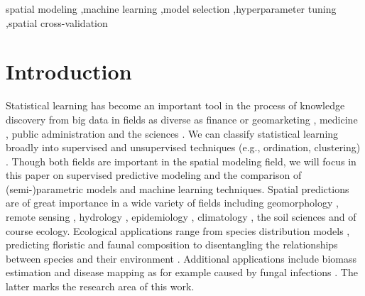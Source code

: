 \documentclass[review]{elsarticle}
\begin{document}
\begin{frontmatter}
	\begin{keyword}
		spatial modeling \sep machine learning \sep model selection \sep hyperparameter tuning \sep spatial cross-validation
	\end{keyword}

\end{frontmatter}


\begin{acronym}[AUROC]

\end{acronym}

\section{Introduction}
\label{sec:intro}
Statistical learning has become an important tool in the process of knowledge discovery from big data in fields as diverse as finance or geomarketing \citep{Heaton2016, Schernthanner2017}, medicine \citep{Leung2016}, public administration \citep{Maenner2016} and the sciences \citep{Garofalo2016}.
We can classify statistical learning broadly into supervised and unsupervised techniques (e.g., ordination, clustering) \citep{James2013}.
Though both fields are important in the spatial modeling field, we will focus in this paper on supervised predictive modeling and the comparison of (semi-)parametric models and machine learning techniques.
Spatial predictions are of great importance in a wide variety of fields including geomorphology \citep{brenning_landslide_2015}, remote sensing \citep{Stelmaszczuk2017}, hydrology \citep{Naghibi2016}, epidemiology \citep{Alder2017}, climatology \citep{Voyant2017}, the soil sciences \citep{Hengl2017} and of course ecology.
Ecological applications range from species distribution models \citep{Halvorsen2016, Quillfeldt2017, Wieland2017}, predicting floristic \citep{muenchow_coupling_2013} and faunal composition to disentangling the relationships between species and their environment \citep{muenchow_soil_2013}.
Additional applications include biomass estimation \citep{Fassnacht2014} and disease mapping as for example caused by fungal infections \citep{Iturritxa2014}.
The latter marks the research area of this work.
\end{document}
